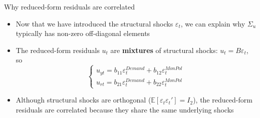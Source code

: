 \documentclass[10pt,handout]{beamer}
\begin{document}
\begin{frame}
{Why reduced-form residuals are correlated}
\begin{itemize}
\item Now that we have introduced the structural shocks $\varepsilon_t$, we can explain why $\Sigma_u$ typically has non-zero off-diagonal elements\bigskip\pause
\item The reduced-form residuals $u_t$ are \textbf{mixtures} of structural shocks: $u_t = B\varepsilon_t$, so\smallskip
\begin{equation*}
\left\{
\begin{array}{l}
u_{yt}=b_{11}\varepsilon_{t}^{Demand}+b_{12}\varepsilon_{t}^{MonPol} \\
u_{rt}=b_{21}\varepsilon_{t}^{Demand}+b_{22}\varepsilon_{t}^{MonPol}%
\end{array}%
\right.
\end{equation*}\pause
\item Although structural shocks are orthogonal ($\mathbb{E}[\varepsilon_t\varepsilon_t']=I_2$), the reduced-form residuals are correlated because they share the same underlying shocks
\end{itemize}
\end{frame}
\shownotesblock{}
\end{document}
